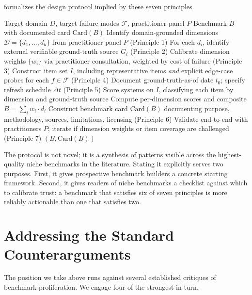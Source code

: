 \documentclass[11pt,a4paper]{article}
\begin{document}
 formalizes the design protocol implied by these seven principles.

\begin{algorithm}[H]
\caption{Niche Benchmark Construction Protocol}
\label{alg:design}
\begin{algorithmic}[1]
\Require Target domain $D$, target failure modes $\mathcal{F}$, practitioner panel $P$
\Ensure Benchmark $B$ with documented card $\text{Card}(B)$
\State Identify domain-grounded dimensions $\mathcal{D} = \{d_1, \ldots, d_k\}$ from practitioner panel $P$ (Principle 1)
\State For each $d_i$, identify external verifiable ground-truth source $G_i$ (Principle 2)
\State Calibrate dimension weights $\{w_i\}$ via practitioner consultation, weighted by cost of failure (Principle 3)
\State Construct item set $I$, including representative items \emph{and} explicit edge-case probes for each $f \in \mathcal{F}$ (Principle 4)
\State Document ground-truth-as-of date $t_0$; specify refresh schedule $\Delta t$ (Principle 5)
\State Score systems on $I$, classifying each item by dimension and ground-truth source
\State Compute per-dimension scores and composite $B = \sum_i w_i \cdot d_i$
\State Construct benchmark card $\text{Card}(B)$ documenting purpose, methodology, sources, limitations, licensing (Principle 6)
\State Validate end-to-end with practitioners $P$; iterate if dimension weights or item coverage are challenged (Principle 7)
\State \Return $(B, \text{Card}(B))$
\end{algorithmic}
\end{algorithm}

The protocol is not novel; it is a synthesis of patterns visible across the highest-quality niche benchmarks in the literature. Stating it explicitly serves two purposes. First, it gives prospective benchmark builders a concrete starting framework. Second, it gives readers of niche benchmarks a checklist against which to calibrate trust: a benchmark that satisfies six of seven principles is more reliably actionable than one that satisfies two.

\section{Addressing the Standard Counterarguments}
\label{sec:counterarguments}

The position we take above runs against several established critiques of benchmark proliferation. We engage four of the strongest in turn.
\end{document}
